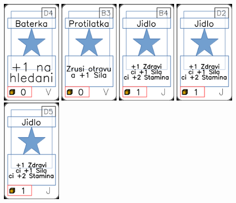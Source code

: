 \documentclass[a4paper]{article}
\begin{document}
	\includegraphics[width=3.0cm]{img-1_78}
	\includegraphics[width=3.0cm]{img-1_67}
	\includegraphics[width=3.0cm]{img-1_8}
	\includegraphics[width=3.0cm]{img-1_16}
	\includegraphics[width=3.0cm]{img-1_19}
\end{document}
